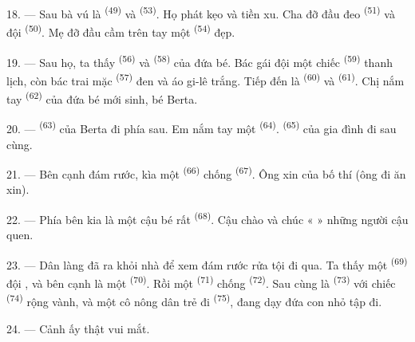 18. --- Sau bà vú là  \textsuperscript{(49)} và 
\textsuperscript{(53)}. Họ phát kẹo và tiền xu. Cha đỡ đầu đeo 
\textsuperscript{(51)} và đội  \textsuperscript{(50)}. Mẹ đỡ đầu cầm
trên tay một  \textsuperscript{(54)} đẹp.

19. --- Sau họ, ta thấy  \textsuperscript{(56)} và 
\textsuperscript{(58)} của đứa bé. Bác gái đội một chiếc 
\textsuperscript{(59)} thanh lịch, còn bác trai mặc 
\textsuperscript{(57)} đen và áo gi-lê trắng. Tiếp đến là 
\textsuperscript{(60)} và  \textsuperscript{(61)}. Chị nắm tay
 \textsuperscript{(62)} của đứa bé mới sinh, bé Berta.

20. ---  \textsuperscript{(63)} của Berta đi phía sau. Em nắm tay một
 \textsuperscript{(64)}.  \textsuperscript{(65)} của
gia đình đi sau cùng.

\VUsaut{4.6mm}
\VUsaut{3.4mm}

21. --- Bên cạnh đám rước, kìa một  \textsuperscript{(66)} chống
 \textsuperscript{(67)}. Ông xin của bố thí (ông đi ăn xin).

22. --- Phía bên kia là một cậu bé rất  \textsuperscript{(68)}. Cậu chào
và chúc «  » những người cậu quen.

23. --- Dân làng đã ra khỏi nhà để xem đám rước rửa tội đi qua. Ta thấy một  \textsuperscript{(69)} đội , và bên cạnh là một
 \textsuperscript{(70)}. Rồi một 
\textsuperscript{(71)} chống  \textsuperscript{(72)}. Sau cùng là  \textsuperscript{(73)} với chiếc  \textsuperscript{(74)} rộng
vành, và một cô nông dân trẻ đi  \textsuperscript{(75)}, đang dạy đứa
con nhỏ tập đi.

24. --- Cảnh ấy thật vui mắt.

\VUsaut{4.0mm}
\VUsaut{3.0mm}

\VUsaut{2.4mm}

\VUsaut{3.0mm}

